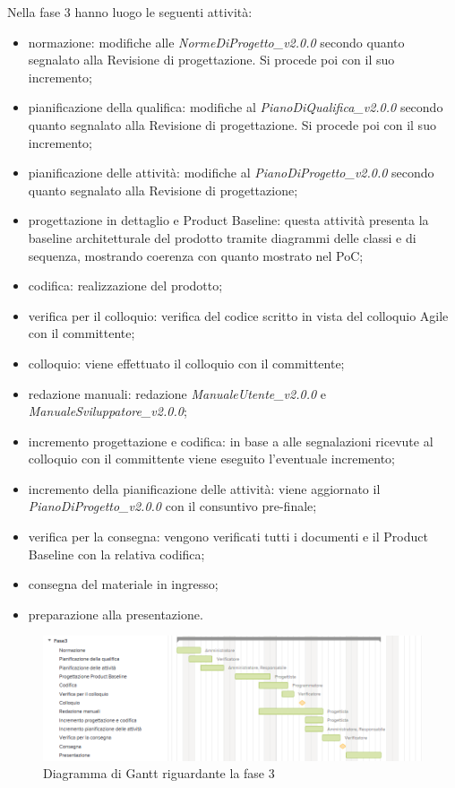 Nella fase 3 hanno luogo le seguenti attività:
\begin{itemize}
	\item normazione: modifiche alle \textit{NormeDiProgetto\_v2.0.0} secondo quanto segnalato alla Revisione di progettazione. Si procede poi con il suo incremento;
	\item pianificazione della qualifica: modifiche al \textit{PianoDiQualifica\_v2.0.0} secondo quanto segnalato alla Revisione di progettazione. Si procede poi con il suo incremento;
	\item pianificazione delle attività: modifiche al \textit{PianoDiProgetto\_v2.0.0} secondo quanto segnalato alla Revisione di progettazione;
	\item progettazione in dettaglio e Product Baseline: questa attività presenta la baseline architetturale del prodotto tramite diagrammi delle classi e di sequenza, mostrando coerenza con quanto mostrato nel PoC;
	\item codifica: realizzazione del prodotto;
	\item verifica per il colloquio: verifica del codice scritto in vista del colloquio Agile con il committente;
	\item colloquio: viene effettuato il colloquio con il committente;
	\item redazione manuali: redazione \textit{ManualeUtente\_v2.0.0} e \textit{ManualeSviluppatore\_v2.0.0};
	\item incremento progettazione e codifica: in base a alle segnalazioni ricevute al colloquio con il committente viene eseguito l'eventuale incremento;
	\item incremento della pianificazione delle attività: viene aggiornato il \textit{PianoDiProgetto\_v2.0.0} con il consuntivo pre-finale;
	\item verifica per la consegna: vengono verificati tutti i documenti e il Product Baseline con la relativa codifica;
	\item consegna del materiale in ingresso;
	\item preparazione alla presentazione.
\end{itemize}

\begin{figure}[h]
	\centering
	\includegraphics[scale=0.70]{images/fase3.png}
	\caption{Diagramma di Gantt riguardante la fase 3}
\end{figure}